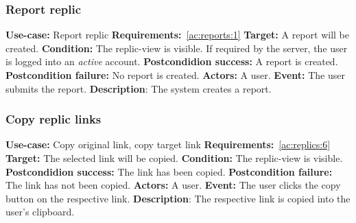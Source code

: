 \subsubsection{Report replic}\label{subsubsec:report-replic}
\textbf{Use-case:} Report replic \newline
\textbf{Requirements:}~\ref{ac:reports:1} \newline
\textbf{Target:} A report will be created. \newline
\textbf{Condition:} The replic-view is visible.
If required by the server, the user is logged into an \textit{active} account. \newline
\textbf{Postcondidion success:} A report is created. \newline
\textbf{Postcondition failure:} No report is created. \newline
\textbf{Actors:} A user. \newline
\textbf{Event:} The user submits the report. \newline
\textbf{Description}: The system creates a report.

\subsubsection{Copy replic links}\label{subsubsec:copy-replic-links}
\textbf{Use-case:} Copy original link, copy target link \newline
\textbf{Requirements:}~\ref{ac:replics:6} \newline
\textbf{Target:} The selected link will be copied. \newline
\textbf{Condition:} The replic-view is visible. \newline
\textbf{Postcondidion success:} The link has been copied. \newline
\textbf{Postcondition failure:} The link has not been copied. \newline
\textbf{Actors:} A user. \newline
\textbf{Event:} The user clicks the copy button on the respective link. \newline
\textbf{Description}: The respective link is copied into the user's clipboard.

